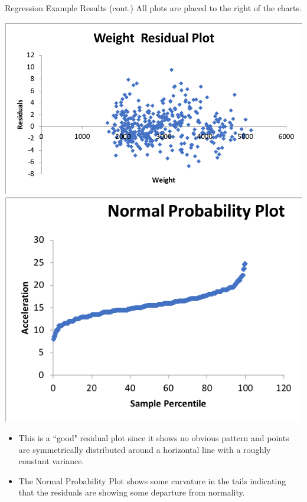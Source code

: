 \documentclass[xcolor=svgnames, handout]{beamer}
\begin{document}
\begin{frame}[label=current]{Regression Example Results (cont.)}
 All plots are placed to the right of the charts.\\ 
\begin{center}
\includegraphics[height=.4\textheight]{RER2}\includegraphics[height=.4\textheight]{normalpp}
\end{center}
\begin{itemize}
\item This is a ``good" residual plot since it shows no obvious pattern and  points are  symmetrically distributed  around a horizontal line with a roughly constant variance.
\item The Normal Probability Plot shows some curvature in the tails indicating that the residuals are showing some departure from normality. 
\end{itemize}
\end{frame}
\end{document}
